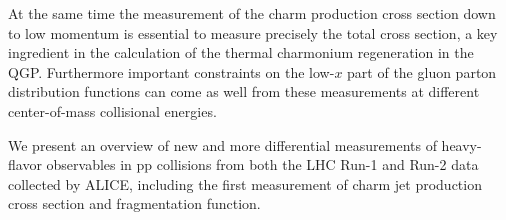 \documentclass[12pt]{article}
\begin{document}
At the same time the measurement of the charm production cross section down
to low momentum is essential to measure precisely the total cross section, a key ingredient in the calculation
of the thermal charmonium regeneration in the QGP. Furthermore important constraints on the low-$x$ part of the gluon parton distribution functions can come
as well from these measurements at different center-of-mass collisional energies.

We present an overview of new and more differential measurements of heavy-flavor observables in pp collisions 
from both the LHC Run-1 and Run-2 data collected by ALICE,
including the first measurement of charm jet production cross section and fragmentation function.
\end{document}
